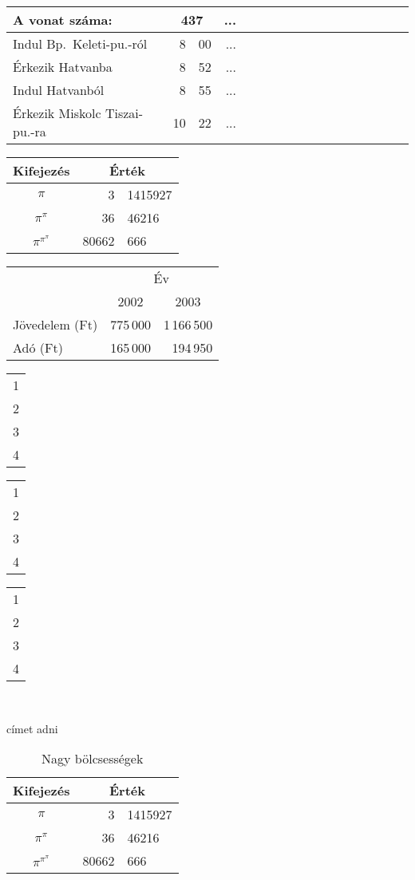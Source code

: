 \documentclass[a4paper]{article}
\begin{document}
\begin{tabular}{l||*8{r@{:}l|}}
A vonat száma: & \multicolumn{2}{c|}{437} & ...
\\
\hline\hline
Indul Bp.\ Keleti-pu.-ról & 8&00 & ... \\
Érkezik Hatvanba & 8&52 & ... \\
Indul Hatvanból & 8&55 & ... \\
Érkezik Miskolc Tiszai-pu.-ra & 10&22 & ... \\
\hline
\end{tabular}

\begin{tabular}{c|r@{,}l}
Kifejezés & \multicolumn{2}{c}{Érték} \\
\hline
$\pi$ & 3&1415927 \\
$\pi^\pi$ & 36&46216 \\
$\pi^{\pi^\pi}$ & 80662&666
\end{tabular}

\begin{tabular}{@{}lrr@{}}
\toprule
&\multicolumn{2}{c}{Év}\\
\cmidrule{2-3}
& \multicolumn{1}{c}{2002} &
\multicolumn{1}{c}{2003}\\
\midrule
Jövedelem (Ft)& 775\,000 & 1\,166\,500\\
Adó (Ft) & 165\,000 & 194\,950\\
\bottomrule
\end{tabular}

\hrulefill \begin{tabular}[t]{c} 1 \\ 2 \\ 3 \\ 4\end{tabular}%
\hrulefill \begin{tabular}{c} 1 \\ 2 \\ 3 \\ 4 \end{tabular}%
\hrulefill \begin{tabular}[b]{c} 1 \\ 2 \\ 3 \\ 4 \end{tabular}%
\hrulefill \\

\begin{table}[htb]
\caption{Nagy bölcsességek} %
címet adni
\label{tab:fontos}
\center
\begin{tabular}{c|r@{,}l}
Kifejezés & \multicolumn{2}{c}{Érték} \\
\hline
$\pi$ & 3&1415927 \\
$\pi^\pi$ & 36&46216 \\
$\pi^{\pi^\pi}$ & 80662&666
\end{tabular}
\end{table}
\end{document}
